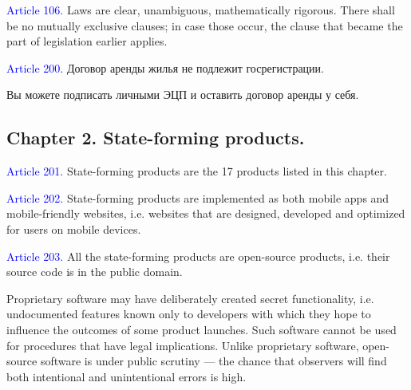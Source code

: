 \documentclass[11pt]{article}
\theoremstyle{remark}
\theoremstyle{definition}
\begin{document}
\textcolor{blue}{Article 106.} Laws are clear, unambiguous, mathematically rigorous. There shall be no mutually exclusive clauses; in case those occur, the clause that became the part of legislation earlier applies.





\textcolor{blue}{Article 200.} Договор аренды жилья не подлежит госрегистрации. 




Вы можете подписать личными ЭЦП и оставить договор аренды у себя.





\subsection*{Chapter 2. State-forming products.}



\textcolor{blue}{Article 201.} State-forming products are the 17 products listed in this chapter.

\textcolor{blue}{Article 202.} State-forming products are implemented as both mobile apps and mobile-friendly websites, i.e. websites that are designed, developed and optimized for users on mobile devices. 



\textcolor{blue}{Article 203.} All the state-forming products are open-source products, i.e. their source code is in the public domain.

\color{blue}

Proprietary software may have deliberately created secret functionality, i.e. undocumented features known only to developers with which they hope to influence the outcomes of some product launches. Such software cannot be used for procedures that have legal implications. Unlike proprietary software, open-source software is under public scrutiny --- the chance that observers will find both intentional and unintentional errors is high.
\end{document}
